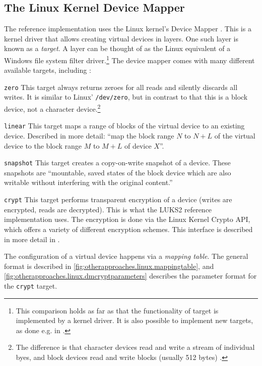 \subsection{The Linux Kernel Device Mapper}
\label{chap:otherapproaches.linux.dm}
The reference implementation uses the Linux kernel's Device Mapper \cite{Dmcrypt2020}. This is a kernel driver that allows creating virtual devices in layers. One such layer is known as a \emph{target}. A layer can be thought of as the Linux equivalent of a Windows file system filter driver.\footnote{\label{fn:otherapproaches.linux.dmtargetdriver} This comparison holds as far as that the functionality of target is implemented by a kernel driver. It is also possible to implement new targets, as done e.g. in \cite{Barker2019}.} The device mapper comes with many different available targets, including \cite{Linux}:
\begin{descitemize}
	\item[\texttt{zero}] This target always returns zeroes for all reads and silently discards all writes. It is similar to Linux' \texttt{/dev/zero}, but in contrast to that this is a block device, not a character device.\footnote{\label{fn:otherapproaches.linux.charvsblock} The difference is that character devices read and write a stream of individual byes, and block devices read and write blocks (usually 512 bytes) \cite{Corbet2005}.}
	\item[\texttt{linear}] This target maps a range of blocks of the virtual device to an existing device. Described in more detail: ``map the block range $N$ to $N+L$ of the virtual device to the block range $M$ to $M+L$ of device $X$''.
	\item[\texttt{snapshot}] This target creates a copy-on-write snapshot of a device. These snapshots are ``mountable, saved states of the block device which are also writable without interfering with the original content.'' \cite{Linux}
	\item[\texttt{crypt}] This target performs transparent encryption of a device (writes are encrypted, reads are decrypted). This is what the LUKS2 reference implementation uses. The encryption is done via the Linux Kernel Crypto API, which offers a variety of different encryption schemes. This interface is described in more detail in \cite{Linux}.
\end{descitemize}

The configuration of a virtual device happens via a \emph{mapping table}. The general format is described in \autoref{fig:otherapproaches.linux.mappingtable}, and \autoref{fig:otherapproaches.linux.dmcryptparameters} describes the parameter format for the \texttt{crypt} target.

